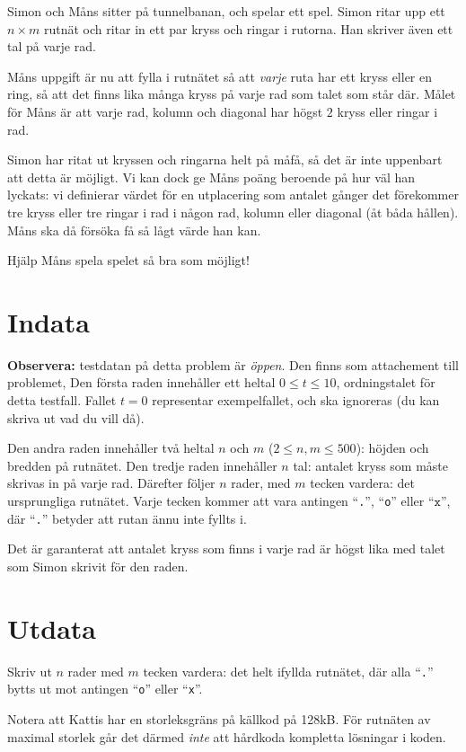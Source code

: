 Simon och Måns sitter på tunnelbanan, och spelar ett spel.
Simon ritar upp ett $n \times m$ rutnät och ritar in ett par kryss och ringar i rutorna.
Han skriver även ett tal på varje rad.

Måns uppgift är nu att fylla i rutnätet så att \emph{varje} ruta har ett kryss eller en ring, så att
det finns lika många kryss på varje rad som talet som står där.
Målet för Måns är att varje rad, kolumn och diagonal har högst $2$ kryss eller ringar i rad.

Simon har ritat ut kryssen och ringarna helt på måfå, så det är inte uppenbart att detta är möjligt.
Vi kan dock ge Måns poäng beroende på hur väl han lyckats: vi definierar värdet för en utplacering
som antalet gånger det förekommer tre kryss eller tre ringar i rad i någon rad, kolumn eller diagonal
(åt båda hållen).
Måns ska då försöka få så lågt värde han kan.

Hjälp Måns spela spelet så bra som möjligt!

\section*{Indata}
\textbf{Observera:} testdatan på detta problem är \emph{öppen}. Den finns som attachement till problemet,
Den första raden innehåller ett heltal $0 \le t \le 10$, ordningstalet för detta testfall.
Fallet $t = 0$ representar exempelfallet, och ska ignoreras (du kan skriva ut vad du vill då).

Den andra raden innehåller två heltal $n$ och $m$ ($2 \le n, m \le 500$): höjden och bredden på rutnätet.
Den tredje raden innehåller $n$ tal: antalet kryss som måste skrivas in på varje rad.
Därefter följer $n$ rader, med $m$ tecken vardera: det ursprungliga rutnätet.
Varje tecken kommer att vara antingen ``\texttt{.}'', ``\texttt{o}'' eller ``$\texttt{x}$'',
där ``\texttt{.}'' betyder att rutan ännu inte fyllts i.

Det är garanterat att antalet kryss som finns i varje rad är högst lika med talet som Simon skrivit för den raden.

\section*{Utdata}
Skriv ut $n$ rader med $m$ tecken vardera: det helt ifyllda rutnätet, där alla ``\texttt{.}'' bytts
ut mot antingen ``\texttt{o}'' eller ``\texttt{x}''.

Notera att Kattis har en storleksgräns på källkod på 128kB. För rutnäten av maximal storlek går det därmed
\emph{inte} att hårdkoda kompletta lösningar i koden.

